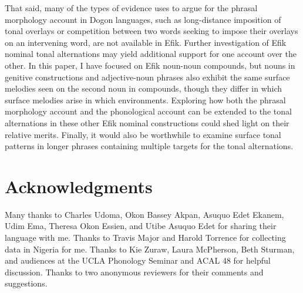 \documentclass[output=paper]{langscibook}
\begin{document}
That said, many of the types of evidence \citet{McPherson2014} uses to argue for the phrasal morphology account in Dogon languages, such as long-distance imposition of tonal overlays or competition between two words seeking to impose their overlays on an intervening word, are not available in Efik. Further investigation of Efik nominal tonal alternations may yield additional support for one account over the other. In this paper, I have focused on Efik noun-noun compounds, but nouns in genitive constructions and adjective-noun phrases also exhibit the same surface melodies seen on the second noun in compounds, though they differ in which surface melodies arise in which environments. Exploring how both the phrasal morphology account and the phonological account can be extended to the tonal alternations in these other Efik nominal constructions could shed light on their relative merits. Finally, it would also be worthwhile to examine surface tonal patterns in longer phrases containing multiple targets for the tonal alternations.

 

\section*{Acknowledgments}

Many thanks to Charles Udoma, Okon Bassey Akpan, Asuquo Edet Ekanem, Udim Ema, Theresa Okon Essien, and Utibe Asuquo Edet for sharing their language with me. Thanks to Travis Major and Harold Torrence for collecting data in Nigeria for me. Thanks to Kie Zuraw, Laura McPherson, Beth Sturman, and audiences at the UCLA Phonology Seminar and ACAL 48 for helpful discussion. Thanks to two anonymous reviewers for their comments and suggestions. 
\end{document}
